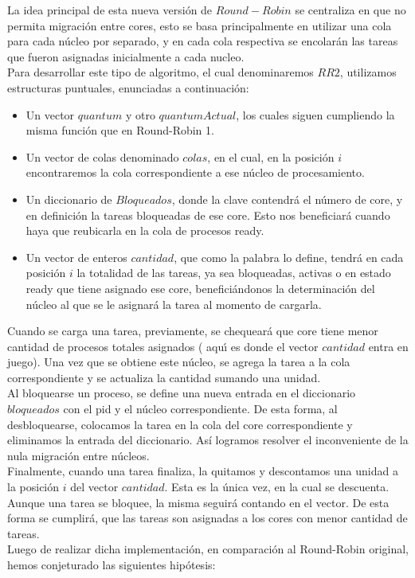 La idea principal de esta nueva versi\'{o}n de $Round-Robin$ se centraliza en que no permita migraci\'{o}n entre
cores, esto se basa principalmente en utilizar una cola para cada núcleo por separado, y en cada
cola respectiva se encolar\'{a}n las tareas que fueron asignadas inicialmente a cada nucleo.\\
Para desarrollar este tipo de algoritmo, el cual denominaremos $RR2$, utilizamos estructuras
puntuales, enunciadas a continuación:\\
\begin{itemize}
 \item Un vector $quantum$ y otro $quantumActual$, los cuales siguen cumpliendo la misma funci\'{o}n que
 en Round-Robin 1.
 \item Un vector de colas denominado $colas$, en el cual, en la posición $i$ encontraremos la cola correspondiente
 a ese núcleo de procesamiento.
 \item Un diccionario de $Bloqueados$, donde la clave contendr\'{a} el número de core, y en definición
 la tareas bloqueadas de ese core. Esto nos beneficiar\'{a} cuando haya que reubicarla en la cola de procesos ready.
 \item Un vector de enteros $cantidad$, que como la palabra lo define, tendrá en cada posición $i$ 
 la totalidad de las tareas, ya sea bloqueadas, activas o en estado ready que tiene asignado ese core, benefici\'{a}ndonos
 la determinación del núcleo al que se le asignará la tarea al momento de cargarla.
\end{itemize}
Cuando se carga una tarea, previamente, se chequeará que core tiene menor cantidad de procesos totales asignados (
aqu\'{\i} es donde el vector $cantidad$ entra en juego). Una vez que se obtiene este n\'{u}cleo, se agrega 
la tarea a la cola correspondiente y se actualiza la cantidad sumando una unidad.\\
\indent Al bloquearse un proceso, se define una nueva entrada en el diccionario $bloqueados$ con el
pid y el n\'{u}cleo correspondiente. De esta forma, al desbloquearse, colocamos la tarea en la cola del core
correspondiente y eliminamos la entrada del diccionario. Así logramos resolver el inconveniente de la nula
migración entre n\'{u}cleos.\\
\indent Finalmente, cuando una tarea finaliza, la quitamos y descontamos una unidad a la posición $i$ del vector
$cantidad$. Esta es la única vez, en la cual se descuenta. Aunque una tarea se bloquee, la misma
seguirá contando en el vector. De esta forma se cumplirá, que las tareas son asignadas a los cores
con menor cantidad de tareas.\\
Luego de realizar dicha implementación, en comparación al Round-Robin original, hemos conjeturado 
las siguientes hipótesis:


